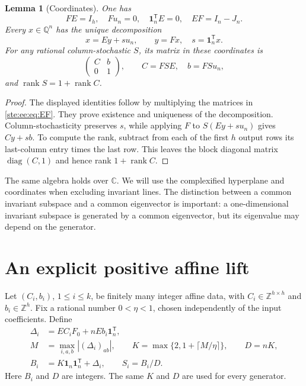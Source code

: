 \documentclass[11pt,letterpaper]{article}
\newtheorem{lemma}[theorem]{Lemma}
\theoremstyle{definition}
\theoremstyle{remark}
\newcommand{\Z}{\mathbb Z}
\newcommand{\Q}{\mathbb Q}
\newcommand{\C}{\mathbb C}
\newcommand{\one}{\mathbf 1}
\DeclareMathOperator{\diag}{diag}
\newcommand{\rk}{\operatorname{rank}}
\newcommand{\transpose}{^{\mathsf T}}
\begin{document}
\begin{lemma}[Coordinates]\label{ste:ee:lem:coordinates}
One has
\[
 FE=I_h,\quad Fu_n=0,\quad \one_n\transpose E=0,\quad
 EF=I_n-J_n.
\]
Every $x\in\Q^n$ has the unique decomposition
\[
 x=Ey+s u_n,\qquad y=Fx,\quad s=\one_n\transpose x.
\]
For any rational column-stochastic $S$, its matrix in these coordinates is
\begin{equation}
 \begin{pmatrix}C&b\\0&1\end{pmatrix},\qquad
 C=FSE,\quad b=FSu_n,
 \label{ste:ee:eq:generalblock}
\end{equation}
and $\rk S=1+\rk C$.
\end{lemma}
\begin{proof}
The displayed identities follow by multiplying the matrices in
\eqref{ste:ee:eq:EF}. They prove existence and uniqueness of the decomposition.
Column-stochasticity preserves $s$, while applying $F$ to $S(Ey+s u_n)$ gives
$Cy+sb$. To compute the rank, subtract from each of the first $h$ output rows its
last-column entry times the last row. This leaves the block diagonal matrix
$\diag(C,1)$ and hence rank $1+\rk C$.
\end{proof}

The same algebra holds over $\C$. We will use the complexified hyperplane and
coordinates when excluding invariant lines. The distinction between a common
invariant subspace and a common eigenvector is important: a one-dimensional
invariant subspace is generated by a common eigenvector, but its eigenvalue may
depend on the generator.

\section{An explicit positive affine lift}
\label{ste:ee:sec:lift}

Let $(C_i,b_i)$, $1\leq i\leq k$, be finitely many integer affine data, with
$C_i\in\Z^{h\times h}$ and $b_i\in\Z^h$. Fix a rational number
$0<\eta<1$, chosen independently of the input coefficients. Define
\begin{align}
 \Delta_i&=EC_iF_0+nEb_i\one_n\transpose,\label{ste:ee:eq:delta}\\
 M&=\max_{i,a,b}|(\Delta_i)_{ab}|,\qquad
 K=\max\{2,1+\lceil M/\eta\rceil\},\qquad D=nK,\label{ste:ee:eq:scale}\\
 B_i&=K\one_n\one_n\transpose+\Delta_i,\qquad S_i=B_i/D.
 \label{ste:ee:eq:positiveB}
\end{align}
Here $B_i$ and $D$ are integers. The same $K$ and $D$ are used for every generator.
\end{document}
